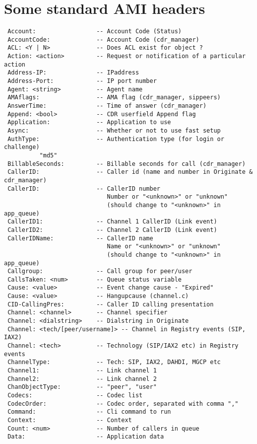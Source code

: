 \section{Some standard AMI headers}
\begin{verbatim}
 Account:                 -- Account Code (Status)
 AccountCode:             -- Account Code (cdr_manager)
 ACL: <Y | N>             -- Does ACL exist for object ?
 Action: <action>         -- Request or notification of a particular action
 Address-IP:              -- IPaddress
 Address-Port:            -- IP port number
 Agent: <string>          -- Agent name
 AMAflags:                -- AMA flag (cdr_manager, sippeers)
 AnswerTime:              -- Time of answer (cdr_manager)
 Append: <bool>           -- CDR userfield Append flag
 Application:             -- Application to use
 Async:                   -- Whether or not to use fast setup
 AuthType:                -- Authentication type (for login or challenge)
          "md5"
 BillableSeconds:         -- Billable seconds for call (cdr_manager)
 CallerID:                -- Caller id (name and number in Originate & cdr_manager)
 CallerID:                -- CallerID number
                             Number or "<unknown>" or "unknown"
                             (should change to "<unknown>" in app_queue)
 CallerID1:               -- Channel 1 CallerID (Link event)
 CallerID2:               -- Channel 2 CallerID (Link event)
 CallerIDName:            -- CallerID name
                             Name or "<unknown>" or "unknown"
                             (should change to "<unknown>" in app_queue)
 Callgroup:               -- Call group for peer/user
 CallsTaken: <num>        -- Queue status variable
 Cause: <value>           -- Event change cause - "Expired"
 Cause: <value>           -- Hangupcause (channel.c)
 CID-CallingPres:         -- Caller ID calling presentation
 Channel: <channel>       -- Channel specifier
 Channel: <dialstring>    -- Dialstring in Originate
 Channel: <tech/[peer/username]> -- Channel in Registry events (SIP, IAX2)
 Channel: <tech>          -- Technology (SIP/IAX2 etc) in Registry events
 ChannelType:             -- Tech: SIP, IAX2, DAHDI, MGCP etc
 Channel1:                -- Link channel 1
 Channel2:                -- Link channel 2
 ChanObjectType:          -- "peer", "user"
 Codecs:                  -- Codec list
 CodecOrder:              -- Codec order, separated with comma ","
 Command:                 -- Cli command to run
 Context:                 -- Context
 Count: <num>             -- Number of callers in queue
 Data:                    -- Application data

\end{verbatim}
